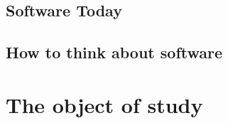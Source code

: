 \documentclass[a4paper,man,natbib]{apa6}
\begin{document}

  \subsection*{Software Today}


  \subsection*{How to think about software}  

  \section*{The object of study}
\end{document}
